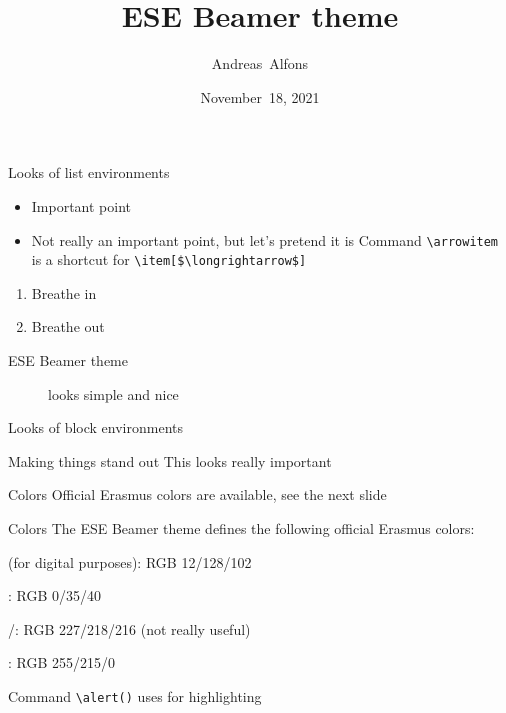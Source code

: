 \documentclass[pdfpagelabels=false, usepdftitle=false]{beamer}
\title{ESE Beamer theme}
\author{
  Andreas~Alfons
}
\institute[EUR]{Erasmus School of Economics, Erasmus University Rotterdam}
\date{November~18, 2021}
\begin{document}
\ESEtitleframe  %

\begin{frame}[fragile]{Looks of list environments}
\begin{itemize}
  \item Important point
  \item Not really an important point, but let's pretend it is
  \arrowitem Command \verb+\arrowitem+ is a shortcut for
  \verb+\item[$\longrightarrow$]+
\end{itemize}

\vfill

\begin{enumerate}
  \item Breathe in
  \item Breathe out
\end{enumerate}

\vfill

\begin{description}
  \item[ESE Beamer theme] looks simple and nice
\end{description}
\end{frame}

\begin{frame}[fragile]{Looks of block environments}
\begin{block}{Making things stand out}
This looks really important
\end{block}

\vfill

\begin{alertblock}{Colors}
Official Erasmus colors are available, see the next slide
\end{alertblock}
\end{frame}


\begin{frame}[fragile]{Colors}
The ESE Beamer theme defines the following official Erasmus colors:

\bigskip
\textcolor{EURbrightgreen}{} (for digital purposes):
RGB 12/128/102

\medskip
\textcolor{EURgreen}{}: RGB 0/35/40

\medskip
\textcolor{EURwarmgrey}{/}: RGB 227/218/216
{\small (not really useful)}

\medskip
\textcolor{ESEyellow}{}: RGB 255/215/0

\vfill

\begin{itemize}
  \arrowitem Command \verb+\alert()+ uses \alert{} for
  highlighting
\end{itemize}
\end{frame}
\end{document}
